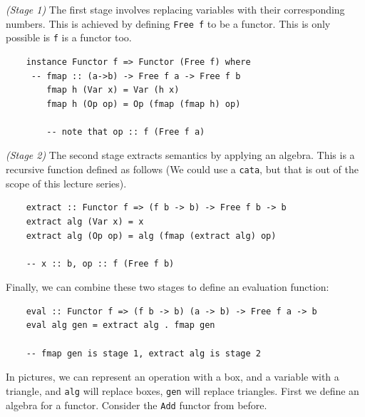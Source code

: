 \documentclass[a4paper,12pt]{article}
\theoremstyle{remark}
\begin{document}
\textit{(Stage 1)} The first stage involves replacing variables with their corresponding numbers. This
is achieved by defining \lstinline{Free f} to be a functor. This is only possible is \lstinline{f} is a
functor too.

\begin{lstlisting}
    instance Functor f => Functor (Free f) where
     -- fmap :: (a->b) -> Free f a -> Free f b
        fmap h (Var x) = Var (h x)
        fmap h (Op op) = Op (fmap (fmap h) op)

        -- note that op :: f (Free f a)  \end{lstlisting}

\begin{figure}[H]
  \centering
\end{figure}

\textit{(Stage 2)} The second stage extracts semantics by applying an algebra. This is a recursive function
defined as follows (We could use a \lstinline{cata}, but that is out of the scope of this lecture series).

\begin{lstlisting}
    extract :: Functor f => (f b -> b) -> Free f b -> b
    extract alg (Var x) = x
    extract alg (Op op) = alg (fmap (extract alg) op)

    -- x :: b, op :: f (Free f b)  \end{lstlisting}

Finally, we can combine these two stages to define an evaluation function:

\begin{lstlisting}
    eval :: Functor f => (f b -> b) (a -> b) -> Free f a -> b
    eval alg gen = extract alg . fmap gen

    -- fmap gen is stage 1, extract alg is stage 2  \end{lstlisting}

In pictures, we can represent an operation with a box, and a variable with a triangle,
and \lstinline{alg} will replace boxes, \lstinline{gen} will replace triangles. First we define an algebra for
a functor. Consider the \lstinline{Add} functor from before.
\end{document}
